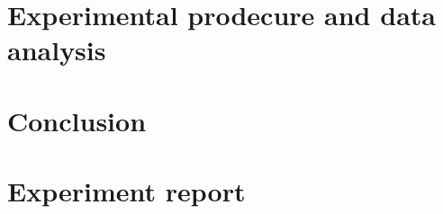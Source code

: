 \documentclass[
    oneside, 
    footinclude=off, 
    captions=tableheading, 
    DIV=12;usenames,
    dvipsnames
]{scrartcl}
\begin{document}
%     

\newpage
\section{Experimental prodecure and data analysis}
    

\newpage
\section{Conclusion}
    


\newpage
    
\newpage
    \listoffigures
    \listoftables


%     
%     

\newpage
    \section{Experiment report}
        
\end{document}
